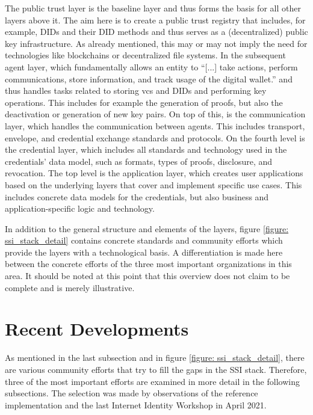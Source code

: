         The public trust layer is the baseline layer and thus forms the basis for all other layers above it. The aim here is to create a public trust registry that includes, for example, \acp{DID} and their \ac{DID} methods and thus serves as a (decentralized) public key infrastructure. As already mentioned, this may or may not imply the need for technologies like blockchains or decentralized file systems. In the subsequent agent layer, which fundamentally allows an entity to “[...] take actions, perform communications, store information, and track usage of the digital wallet.” \cite[p. 192]{preukschat_self-sovereign_2021} and thus handles tasks related to storing \acp{vc} and \acp{DID} and performing key operations. This includes for example the generation of proofs, but also the deactivation or generation of new key pairs. On top of this, is the communication layer, which handles the communication between agents. This includes transport, envelope, and credential exchange standards and protocols. On the fourth level is the credential layer, which includes all standards and technology used in the credentials' data model, such as formats, types of proofs, disclosure, and revocation. The top level is the application layer, which creates user applications based on the underlying layers that cover and implement specific use cases. This includes concrete data models for the credentials, but also business and application-specific logic and technology. \cite{heck_ssi_2020, yildiz_layers_2021, davie_0289_2021, preukschat_self-sovereign_2021}
        
        In addition to the general structure and elements of the layers, figure \ref{figure: ssi_stack_detail} contains concrete standards and community efforts which provide the layers with a technological basis. A differentiation is made here between the concrete efforts of the three most important organizations in this area. It should be noted at this point that this overview does not claim to be complete and is merely illustrative.
		
	\section{Recent Developments}
	    As mentioned in the last subsection and in figure \ref{figure: ssi_stack_detail}, there are various community efforts that try to fill the gaps in the \ac{SSI} stack. Therefore, three of the most important efforts are examined in more detail in the following subsections. The selection was made by observations of the reference implementation and the last Internet Identity Workshop in April 2021.
	    

